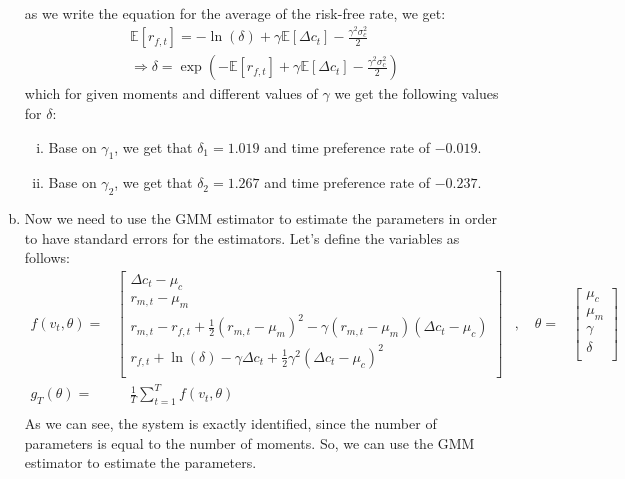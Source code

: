 \begin{enumerate}[(a)]
\begin{gather*}
  \end{gather*}
  as we write the equation for the average of the risk-free rate, we get:
  \begin{gather*}
    \mathbb{E}[r_{f,t}] = - \ln(\delta) + \gamma\mathbb{E}[\Delta c_t ] - \frac{\gamma^2 \sigma_c^2}{2}\\
    \Rightarrow \delta = \exp(- \mathbb{E}[r_{f,t}] + \gamma\mathbb{E}[\Delta c_t ] - \frac{\gamma^2 \sigma_c^2}{2} )
  \end{gather*}
  which for given moments and different values of $\gamma$ we get the following values for $\delta$:
  \begin{enumerate}[i.]
    \item Base on $\gamma_1$, we get that $\delta_1 = 1.019$ and time preference rate of $ -0.019$.
    \item Base on $\gamma_2$, we get that $\delta_2 = 1.267$ and time preference rate of $-0.237$.
  \end{enumerate}

  \item Now we need to use the GMM estimator to estimate the parameters in order to have standard errors for the estimators. Let's define the variables as follows:
  \begin{equation*}
    \begin{aligned}
      f(v_t,\theta) = & \begin{bmatrix}
        \Delta c_t - \mu_c \\
        r_{m,t} - \mu_m \\
        r_{m,t} - r_{f,t} + \frac{1}{2} (r_{m,t} - \mu_m)^2 - \gamma (r_{m,t} - \mu_m)(\Delta c_t - \mu_c) \\
        r_{f,t} + \ln(\delta) -\gamma\Delta c_t +  \frac{1}{2}\gamma^2 (\Delta c_t - \mu_c)^2 \\
      \end{bmatrix} & , \quad 
      \theta = & \begin{bmatrix}
        \mu_c \\
        \mu_m \\
        \gamma \\
        \delta \\
      \end{bmatrix}  \\
      g_T(\theta) = & \quad \frac{1}{T} \sum_{t=1}^T f(v_t,\theta) & \\
    \end{aligned}
    \end{equation*}
    As we can see, the system is exactly identified, since the number of parameters is equal to the number of moments. So, we can use the GMM estimator to estimate the parameters.
    

\end{enumerate}
